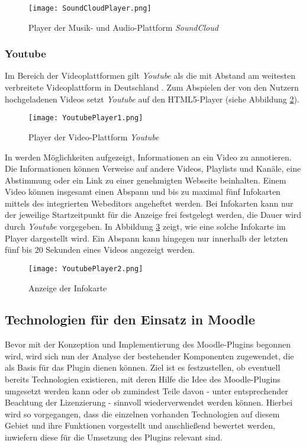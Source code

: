 \begin{figure}[h!]
\texttt{[image: SoundCloudPlayer.png]}
\caption{\label{fig:SoundCloudPlayer}Player der Musik- und Audio-Plattform \textit{SoundCloud} \citep{SoundCloud2015Panic}}
\end{figure}

\subsubsection{Youtube}
 
Im Bereich der Videoplattformen gilt \textit{Youtube} als die mit Abstand am weitesten verbreitete Videoplattform in Deutschland \citep{statista2016video}.  Zum Abspielen der von den Nutzern hochgeladenen Videos setzt \textit{Youtube} auf den HTML5-Player (siehe Abbildung \ref{fig:YoutubePlayer1}).

\begin{figure}[h!]
\texttt{[image: YoutubePlayer1.png]}
\caption{\label{fig:YoutubePlayer1}Player der Video-Plattform \textit{Youtube} \citep{Youtube2015Panic}}
\end{figure}

In \citep{youtubeinfokarten,youtubeabspann} werden Möglichkeiten aufgezeigt, Informationen an ein Video zu annotieren. Die Informationen können Verweise auf andere Videos, Playlists und Kanäle, eine Abstimmung oder ein Link zu einer genehmigten Webseite beinhalten. Einem Video können insgesamt einen Abspann und bis zu maximal fünf Infokarten mittels des integrierten Webeditors angeheftet werden. Bei Infokarten kann nur der jeweilige Startzeitpunkt für die Anzeige frei festgelegt werden, die Dauer wird durch \textit{Youtube} vorgegeben. In Abbildung \ref{fig:YoutubePlayer2} zeigt, wie eine solche Infokarte im Player dargestellt wird. Ein Abspann kann hingegen nur innerhalb der letzten fünf bis 20 Sekunden eines Videos angezeigt werden.

\begin{figure}[h!]
\texttt{[image: YoutubePlayer2.png]}
\caption{\label{fig:YoutubePlayer2}Anzeige der Infokarte \citep{Youtube2015Panic}}
\end{figure}


\subsection{Technologien für den Einsatz in Moodle}
Bevor mit der Konzeption und Implementierung des Moodle-Plugins begonnen wird, wird sich nun der Analyse der bestehender Komponenten zugewendet, die als Basis für das Plugin dienen können. Ziel ist es festzustellen, ob eventuell bereits Technologien existieren, mit deren Hilfe die Idee des Moodle-Plugins umgesetzt werden kann oder ob zumindest Teile davon - unter entsprechender Beachtung der Lizenzierung - sinnvoll wiederverwendet werden können. Hierbei wird so vorgegangen, dass die einzelnen vorhanden Technologien auf diesem Gebiet und ihre Funktionen vorgestellt und anschließend bewertet werden, inwiefern diese für die Umsetzung des Plugins relevant sind.

